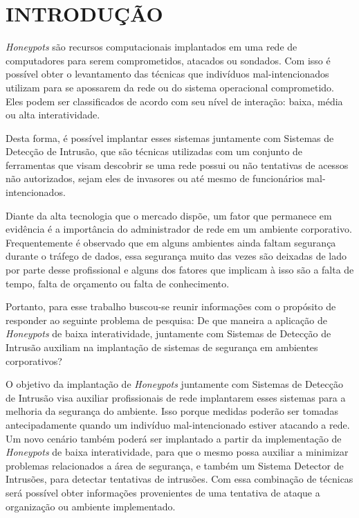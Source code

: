 \chapter{INTRODUÇÃO}
\textit{Honeypots} são recursos computacionais implantados em uma rede de computadores para serem comprometidos, atacados ou sondados. Com isso é possível obter o levantamento das técnicas que indivíduos mal-intencionados utilizam para se apossarem da rede ou do sistema operacional comprometido. Eles podem ser classificados de acordo com seu nível de interação: baixa, média ou alta interatividade.

Desta forma, é possível implantar esses sistemas juntamente com Sistemas de Detecção de Intrusão, que são técnicas utilizadas com um conjunto de ferramentas que visam descobrir se uma rede possui ou não tentativas de acessos não autorizados, sejam eles de invasores ou até mesmo de funcionários mal-intencionados.

Diante da alta tecnologia que o mercado dispõe, um fator que permanece em evidência é a importância do administrador de rede em um ambiente corporativo. Frequentemente é observado que em alguns ambientes ainda faltam segurança durante o tráfego de dados, essa segurança muito das vezes são deixadas de lado por parte desse profissional e alguns dos fatores que implicam à isso são a falta de tempo, falta de orçamento ou falta de conhecimento.

Portanto, para esse trabalho buscou-se reunir informações com o propósito de responder ao seguinte problema de pesquisa: De que maneira a aplicação de \textit{Honeypots} de baixa interatividade, juntamente com Sistemas de Detecção de Intrusão auxiliam na implantação de sistemas de segurança em ambientes corporativos?

O objetivo da implantação de \textit{Honeypots} juntamente com Sistemas de Detecção de Intrusão visa auxiliar profissionais de rede implantarem esses sistemas para a melhoria da segurança do ambiente. Isso porque medidas poderão ser tomadas antecipadamente quando um indivíduo mal-intencionado estiver atacando a rede. Um novo cenário também poderá ser implantado a partir da implementação de \textit{Honeypots} de baixa interatividade, para que o mesmo possa auxiliar a minimizar problemas relacionados a área de segurança, e também um Sistema Detector de Intrusões, para detectar tentativas de intrusões. Com essa combinação de técnicas será possível obter informações provenientes de uma tentativa de ataque a organização ou ambiente implementado.

